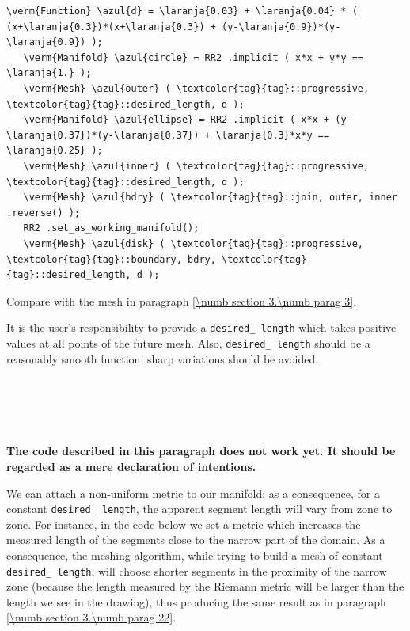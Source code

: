 \begin{Verbatim}[commandchars=\\\{\},formatcom=\small\tt,frame=single,
   label=parag-\ref{\numb section 3.\numb parag 22}.cpp,rulecolor=\color{coment},
   baselinestretch=0.94,framesep=2mm                                            ]
   \verm{Function} \azul{d} = \laranja{0.03} + \laranja{0.04} * ( (x+\laranja{0.3})*(x+\laranja{0.3}) + (y-\laranja{0.9})*(y-\laranja{0.9}) );
   \verm{Manifold} \azul{circle} = RR2 .implicit ( x*x + y*y == \laranja{1.} );
   \verm{Mesh} \azul{outer} ( \textcolor{tag}{tag}::progressive, \textcolor{tag}{tag}::desired_length, d );
   \verm{Manifold} \azul{ellipse} = RR2 .implicit ( x*x + (y-\laranja{0.37})*(y-\laranja{0.37}) + \laranja{0.3}*x*y == \laranja{0.25} );
   \verm{Mesh} \azul{inner} ( \textcolor{tag}{tag}::progressive, \textcolor{tag}{tag}::desired_length, d );
   \verm{Mesh} \azul{bdry} ( \textcolor{tag}{tag}::join, outer, inner .reverse() );
   RR2 .set_as_working_manifold();
   \verm{Mesh} \azul{disk} ( \textcolor{tag}{tag}::progressive, \textcolor{tag}{tag}::boundary, bdry, \textcolor{tag}{tag}::desired_length, d );
\end{Verbatim}

Compare with the mesh in paragraph \ref{\numb section 3.\numb parag 3}.

It is the user's responsibility to provide a {\small\tt desired\_\,length} which takes positive
values at all points of the future mesh.
Also, {\small\tt desired\_\,length} should be a reasonably smooth function;
sharp variations should be avoided.


\section{~~}\label{\numb section 3.\numb parag 23}
 
{\normalfont\bfseries The code described in this paragraph does not work yet.
It should be regarded as a mere declaration of intentions.}
\medskip

We can attach a non-uniform metric to our manifold; as a consequence, for a constant
{\small\tt desired\_\,length}, the apparent segment length will vary from zone to zone.
For instance, in the code below we set a metric which increases the measured length
of the segments close to the narrow part of the domain.
As a consequence, the meshing algorithm, while trying to build a mesh of constant
{\small\tt desired\_\,length}, will choose shorter segments in the proximity of the narrow zone
(because the length measured by the Riemann metric will be larger than the length
we see in the drawing), thus producing the same result as in paragraph
\ref{\numb section 3.\numb parag 22}.

